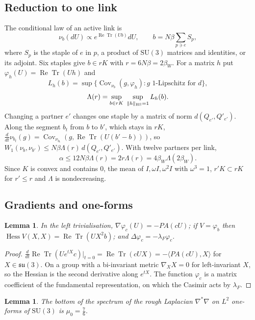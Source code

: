 \documentclass[11pt]{amsart}
\newtheorem{lemma}[theorem]{Lemma}
\theoremstyle{definition}
\theoremstyle{remark}
\numberwithin{equation}{section}
\newcommand{\SU}{\mathrm{SU}}
\newcommand{\ReTr}{\operatorname{Re}\operatorname{Tr}}
\newcommand{\Hess}{\operatorname{Hess}}
\newcommand{\Cov}{\operatorname{Cov}}
\newcommand{\ip}[2]{\langle #1,#2\rangle}
\begin{document}
\subsection{Reduction to one link}

The conditional law of an active link is
\[
\nu_b(dU)\propto e^{\ReTr(Ub)}dU,\qquad b=N\beta\sum_{p\ni e}S_p ,
\]
where $S_p$ is the staple of $e$ in $p$, a product of $\SU(3)$ matrices and
identities, or its adjoint. Six staples give $b\in rK$ with
$r=6N\beta=2\beta_W$. For a matrix $h$ put $\varphi_h(U)=\ReTr(Uh)$ and
\[
L_h(b)=\sup\{\Cov_{\nu_b}(g,\varphi_h):g\text{ 1-Lipschitz for }d\},
\]
\[
\Lambda(r)=\sup_{b\in rK}\ \sup_{\|h\|_{\rm HS}=1}L_h(b).
\]
Changing a partner $e'$ changes one staple by a matrix of norm $d(Q_{e'},
Q'_{e'})$. Along the segment $b_t$ from $b$ to $b'$, which stays in $rK$,
$\frac d{dt}\nu_{b_t}(g)=\Cov_{\nu_{b_t}}(g,\ReTr(U(b'-b)))$, so
$W_1(\nu_b,\nu_{b'})\le N\beta\Lambda(r)\,d(Q_{e'},Q'_{e'})$. With twelve
partners per link,
\begin{equation}\label{eq:alpha}
\alpha\le12N\beta\Lambda(r)=2r\Lambda(r)=4\beta_W\Lambda(2\beta_W).
\end{equation}
Since $K$ is convex and contains $0$, the mean of $I,\omega I,\omega^2I$ with
$\omega^3=1$, $r'K\subset rK$ for $r'\le r$ and $\Lambda$ is nondecreasing.

\subsection{Gradients and one-forms}

\begin{lemma}\label{lem:gradients}
In the left trivialisation, $\nabla\varphi_c(U)=-PA(cU)$; if $V=\varphi_b$
then $\Hess V(X,X)=\ReTr(UX^2b)$; and $\Delta\varphi_c=-\lambda_F\varphi_c$.
\end{lemma}

\begin{proof}
$\frac d{dt}\ReTr(Ue^{tX}c)|_{t=0}=\ReTr(cUX)=-\ip{PA(cU)}X$ for $X\in
\mathfrak{su}(3)$. On a group with a bi-invariant metric $\nabla_XX=0$ for
left-invariant $X$, so the Hessian is the second derivative along $e^{tX}$.
The function $\varphi_c$ is a matrix coefficient of the fundamental
representation, on which the Casimir acts by $\lambda_F$.
\end{proof}

\begin{lemma}\label{lem:roughlap}
The bottom of the spectrum of the rough Laplacian $\nabla^*\nabla$ on $L^2$
one-forms of $\SU(3)$ is $\mu_0=\frac76$.
\end{lemma}
\end{document}
